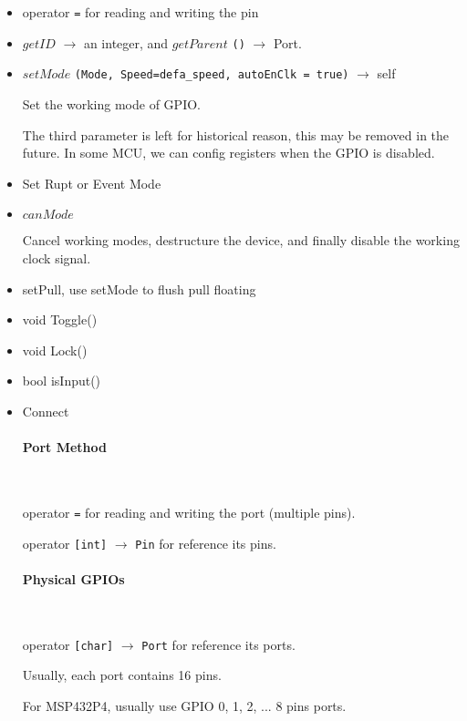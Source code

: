 \begin{itemize}
\item operator \verb`=` for reading and writing the pin

\item $getID$ $\rightarrow$ an integer, and $getParent$ \verb`()` $\rightarrow$ {Port}.

\item $setMode$ \verb`(Mode, Speed=defa_speed, autoEnClk = true)` $\rightarrow$ self

Set the working mode of GPIO.

The third parameter is left for historical reason, this may be removed in the future. In some MCU, we can config registers when the GPIO is disabled. %

\item Set Rupt or Event Mode

\item $canMode$

Cancel working modes, destructure the device, and finally disable the working clock signal.

\item setPull, use setMode to flush pull floating

\item void Toggle()

\item void Lock()

\item bool isInput()

\item Connect %

\paragraph{Port Method} \

operator \verb`=` for reading and writing the port (multiple pins).

operator \verb`[int]` $\rightarrow$ \verb`Pin` for reference its pins.

\paragraph{Physical GPIOs} \

operator \verb`[char]` $\rightarrow$ \verb`Port` for reference its ports.

Usually, each port contains 16 pins.

For MSP432P4, usually use GPIO 0, 1, 2, ... 8 pins ports.


\end{itemize}
